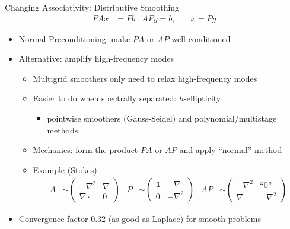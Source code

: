 \begin{frame}{Changing Associativity: Distributive Smoothing}
  \begin{align*}
    P A x &= P b & AP y = b, & \quad x = Py
  \end{align*}
  \begin{itemize}
  \item Normal Preconditioning: make $PA$ or $AP$ well-conditioned
  \item Alternative: amplify high-frequency modes
    \begin{itemize}
    \item Multigrid smoothers only need to relax high-frequency modes
    \item Easier to do when spectrally separated: $h$-ellipticity
      \begin{itemize}
      \item pointwise smoothers (Gauss-Seidel) and polynomial/multistage methods
      \end{itemize}
    \item Mechanics: form the product $PA$ or $AP$ and apply ``normal'' method
    \item Example (Stokes)
      \begin{align*}
        A &\sim \begin{pmatrix} -\nabla^2 & \nabla \\ \nabla\cdot &
          0 \end{pmatrix} &
        P &\sim \begin{pmatrix} \bm 1 & -\nabla \\ 0 & -\nabla^2 \end{pmatrix} &
        AP &\sim
        \begin{pmatrix}
          -\nabla^2 & \text{``0''} \\ \nabla\cdot & -\nabla^2
        \end{pmatrix}
      \end{align*}
    \end{itemize}
  \item Convergence factor \num{0.32} (as good as Laplace) for smooth problems
  \end{itemize}
\end{frame}
